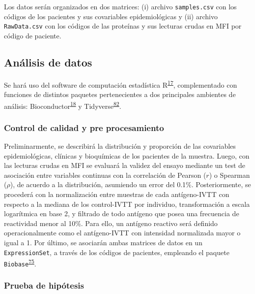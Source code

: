 \documentclass[]{article}
\begin{document}
Los datos serán organizados en dos matrices: (i) archivo
\texttt{samples.csv} con los códigos de los pacientes y sus covariables
epidemiológicas y (ii) archivo \texttt{RawData.csv} con los códigos de
las proteínas y sus lecturas crudas en MFI por código de paciente.

\hypertarget{anadata}{\subsection{Análisis de datos}\label{anadata}}

Se hará uso del software de computación estadística
R\textsuperscript{\protect\hyperlink{ref-R2016}{17}}, complementado con
funciones de distintos paquetes pertenecientes a dos principales
ambientes de análisis:
Bioconductor\textsuperscript{\protect\hyperlink{ref-bioconductor2004}{18}}
y
Tidyverse\textsuperscript{\protect\hyperlink{ref-wickham2016r4ds}{82}}.

\subsubsection{Control de calidad y pre
procesamiento}\label{control-de-calidad-y-pre-procesamiento}

Preliminarmente, se describirá la distribución y proporción de las
covariables epidemiológicas, clínicas y bioquímicas de los pacientes de
la muestra. Luego, con las lecturas crudas en MFI se evaluará la validez
del ensayo mediante un test de asociación entre variables continuas con
la correlación de Pearson (\(r\)) o Spearman (\(\rho\)), de acuerdo a la
distribución, asumiendo un error del 0.1\%. Posteriormente, se procederá
con la normalización entre muestras de cada antígeno-IVTT con respecto a
la mediana de los control-IVTT por individuo, transformación a escala
logarítmica en base 2, y filtrado de todo antígeno que posea una
frecuencia de reactividad menor al 10\%. Para ello, un antígeno reactivo
será definido operacionalmente como el antígeno-IVTT con intensidad
normalizada mayor o igual a 1. Por último, se asociarán ambas matrices
de datos en un \texttt{ExpressionSet}, a través de los códigos de
pacientes, empleando el paquete
\texttt{Biobase}\textsuperscript{\protect\hyperlink{ref-Biobase}{75}}.

\subsubsection{Prueba de hipótesis}\label{prueba-de-hipotesis}
\end{document}
